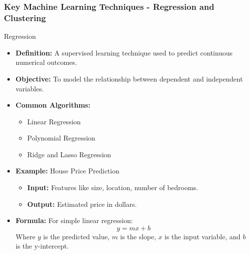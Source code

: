 \documentclass[aspectratio=169]{beamer}
\begin{document}
\begin{frame}[fragile]
  \frametitle{Key Machine Learning Techniques - Regression and Clustering}
  \begin{block}{Regression}
    \begin{itemize}
      \item \textbf{Definition:} A supervised learning technique used to predict continuous numerical outcomes.
      \item \textbf{Objective:} To model the relationship between dependent and independent variables.
      \item \textbf{Common Algorithms:} 
      \begin{itemize}
        \item Linear Regression
        \item Polynomial Regression
        \item Ridge and Lasso Regression
      \end{itemize}
      \item \textbf{Example:} House Price Prediction
        \begin{itemize}
          \item \textbf{Input:} Features like size, location, number of bedrooms.
          \item \textbf{Output:} Estimated price in dollars.
        \end{itemize}
      \item \textbf{Formula:} For simple linear regression:
      \begin{equation}
        y = mx + b
      \end{equation}
      Where $y$ is the predicted value, $m$ is the slope, $x$ is the input variable, and $b$ is the y-intercept.
    \end{itemize}
  \end{block}


\end{frame}
\end{document}
